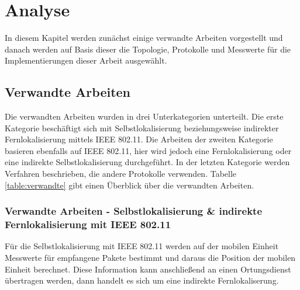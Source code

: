 \chapter{Analyse}
\label{ch:Analyse}
In diesem Kapitel werden zunächst einige verwandte Arbeiten vorgestellt und danach werden auf Basis dieser die Topologie, Protokolle und Messwerte für die Implementierungen dieser Arbeit ausgewählt.

\section{Verwandte Arbeiten} 
Die verwandten Arbeiten wurden in drei Unterkategorien unterteilt. 
Die erste Kategorie beschäftigt sich mit Selbstlokalisierung beziehungsweise indirekter Fernlokalisierung mittels IEEE 802.11.
Die Arbeiten der zweiten Kategorie basieren ebenfalls auf IEEE 802.11, hier wird jedoch eine Fernlokalisierung oder eine indirekte Selbstlokalisierung durchgeführt.
In der letzten Kategorie werden Verfahren beschrieben, die andere Protokolle verwenden.
Tabelle \ref{table:verwandte} gibt einen Überblick über die verwandten Arbeiten.

\subsection{Verwandte Arbeiten - Selbstlokalisierung \& indirekte Fernlokalisierung mit IEEE 802.11}
Für die Selbstlokalisierung mit IEEE 802.11 werden auf der mobilen Einheit Messwerte für empfangene Pakete bestimmt und daraus die Position der mobilen Einheit berechnet.
Diese Information kann anschließend an einen Ortungsdienst übertragen werden, dann handelt es sich um eine indirekte Fernlokaliserung.

